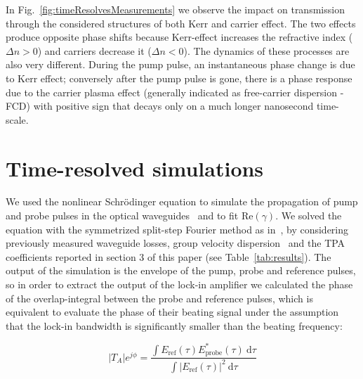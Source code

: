 \documentclass[10pt,letterpaper]{article}
\begin{document}
In Fig.~\ref{fig:timeResolvesMeasurements} we observe the impact on transmission through the considered structures of both Kerr and carrier effect. The two effects produce opposite phase shifts because Kerr-effect increases the refractive index ($\Delta n > 0 $) and carriers decrease it ($ \Delta n < 0 $).  The dynamics  of these processes are also very different. During the pump pulse, an instantaneous phase change is due to Kerr effect; conversely after the pump pulse is gone, there is a phase response due to the carrier plasma effect (generally indicated as free-carrier dispersion - FCD) with positive sign that decays only on a much longer nanosecond time-scale.


\section{Time-resolved simulations}
We used the nonlinear Schr\"{o}dinger equation to simulate the propagation of pump and probe pulses in the optical waveguides~\cite{Agrawal2001a} and to fit Re$(\gamma)$. We solved the equation with the symmetrized split-step Fourier method as in~\cite{Lin2007}, by considering previously measured waveguide losses, group velocity dispersion~\cite{Mas2012} and the TPA coefficients reported in section 3 of this paper (see Table~\ref{tab:results}). The output of the simulation is the envelope of the pump, probe and reference pulses, so in order to extract the output of the lock-in amplifier we calculated the phase of the overlap-integral between the probe and reference pulses, which is equivalent to evaluate the phase of their beating signal under the assumption that the lock-in bandwidth is significantly smaller than the beating frequency:

                                                                \begin{equation}
                                                                        |T_{A}|e^{j\phi} =
                                                                        \frac{\int E_{\mathrm{ref}}(\tau) E^*_{\mathrm{probe}}(\tau) ~ \mathrm{d}\tau}
                                                                        {\int |E_{\mathrm{ref}}(\tau)|^2~\mathrm{d}\tau}
                                                                \end{equation}


    \vspace*{-15pt}                                                                                                                          
                                                                
\end{document}
